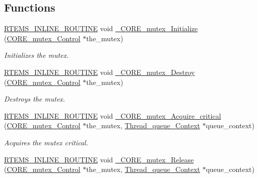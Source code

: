 \subsection*{Functions}
\begin{DoxyCompactItemize}
\item 
\mbox{\hyperlink{group__RTEMSScoreBaseDefs_gac216239df231d5dbd15e3520b0b9313f}{R\+T\+E\+M\+S\+\_\+\+I\+N\+L\+I\+N\+E\+\_\+\+R\+O\+U\+T\+I\+NE}} void \mbox{\hyperlink{group__RTEMSScoreMutex_ga8bc3af4c8e28f7e9090ca1571a0aead6}{\+\_\+\+C\+O\+R\+E\+\_\+mutex\+\_\+\+Initialize}} (\mbox{\hyperlink{structCORE__mutex__Control}{C\+O\+R\+E\+\_\+mutex\+\_\+\+Control}} $\ast$the\+\_\+mutex)
\begin{DoxyCompactList}\small\item\em Initializes the mutex. \end{DoxyCompactList}\item 
\mbox{\hyperlink{group__RTEMSScoreBaseDefs_gac216239df231d5dbd15e3520b0b9313f}{R\+T\+E\+M\+S\+\_\+\+I\+N\+L\+I\+N\+E\+\_\+\+R\+O\+U\+T\+I\+NE}} void \mbox{\hyperlink{group__RTEMSScoreMutex_ga09492f67618d359ba936a14bbd29b98d}{\+\_\+\+C\+O\+R\+E\+\_\+mutex\+\_\+\+Destroy}} (\mbox{\hyperlink{structCORE__mutex__Control}{C\+O\+R\+E\+\_\+mutex\+\_\+\+Control}} $\ast$the\+\_\+mutex)
\begin{DoxyCompactList}\small\item\em Destroys the mutex. \end{DoxyCompactList}\item 
\mbox{\hyperlink{group__RTEMSScoreBaseDefs_gac216239df231d5dbd15e3520b0b9313f}{R\+T\+E\+M\+S\+\_\+\+I\+N\+L\+I\+N\+E\+\_\+\+R\+O\+U\+T\+I\+NE}} void \mbox{\hyperlink{group__RTEMSScoreMutex_ga7efc39f335c242812ebe84999e526db4}{\+\_\+\+C\+O\+R\+E\+\_\+mutex\+\_\+\+Acquire\+\_\+critical}} (\mbox{\hyperlink{structCORE__mutex__Control}{C\+O\+R\+E\+\_\+mutex\+\_\+\+Control}} $\ast$the\+\_\+mutex, \mbox{\hyperlink{structThread__queue__Context}{Thread\+\_\+queue\+\_\+\+Context}} $\ast$queue\+\_\+context)
\begin{DoxyCompactList}\small\item\em Acquires the mutex critical. \end{DoxyCompactList}\item 
\mbox{\hyperlink{group__RTEMSScoreBaseDefs_gac216239df231d5dbd15e3520b0b9313f}{R\+T\+E\+M\+S\+\_\+\+I\+N\+L\+I\+N\+E\+\_\+\+R\+O\+U\+T\+I\+NE}} void \mbox{\hyperlink{group__RTEMSScoreMutex_ga0bb76a8a25cab71b0fdaa1f7b215f809}{\+\_\+\+C\+O\+R\+E\+\_\+mutex\+\_\+\+Release}} (\mbox{\hyperlink{structCORE__mutex__Control}{C\+O\+R\+E\+\_\+mutex\+\_\+\+Control}} $\ast$the\+\_\+mutex, \mbox{\hyperlink{structThread__queue__Context}{Thread\+\_\+queue\+\_\+\+Context}} $\ast$queue\+\_\+context)

\end{DoxyCompactItemize}
